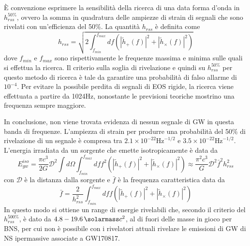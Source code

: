 È convenzione esprimere la sensibilità della ricerca di una data forma d'onda in $h_{rss}^{50\%}$, ovvero la somma in quadratura delle ampiezze di strain di segnali che sono rivelati con un'efficienza del 50\%. La quantità $h_{rss}$ è definita come
\begin{equation}
h_{rss} = \sqrt{2\int_{f_{min}}^{f_{max}}df(|\tilde{h}_+(f)|^2 + |\tilde{h}_\times(f)|^2 )}
\end{equation}
dove $f_{min}$ e $f_{max}$ sono rispettivamente le frequenze massima e minima sulle quali si effettua la ricerca. 
Il criterio sulla soglia di rivelazione e quindi su $h_{rss}^{50\%}$ per questo metodo di ricerca è tale da garantire una probabilità di falso allarme di $10^{-4}$.
Per evitare la possibile perdita di segnali di EOS rigide, la ricerca viene effettuata a partire da 1024Hz, nonostante le previsioni teoriche mostrino una frequenza sempre maggiore.

In conclusione, non viene trovata evidenza di nessun segnale di GW in questa banda di frequenze.
L'ampiezza di strain per produrre una probabilità del 50\% di rivelazione di un segnale è compresa tra $2.1 \times 10^{-22} \text{Hz}^{-1/2}$ e $3.5 \times 10^{-22} \text{Hz}^{-1/2}$. L'energia irradiata da un sorgente che emette isotropicamente è data da 
\begin{equation}
E_{gw}^{iso} = \frac{\pi c^3}{2G}\mathcal{D}^2\int d\Omega \int_{f_{min}}^{f_{max}}dff^2(|\tilde{h}_+(f)|^2 + |\tilde{h}_\times(f)|^2 ) \approx \frac{\pi^2 c^3}{G}\mathcal{D}^2\bar{f}^2h_{rss}^2
\end{equation}
con $\mathcal{D}$ è la distanza dalla sorgente e $\bar{f}$ è la frequenza caratteristica data da 
\begin{equation}
\bar{f} = \frac{2}{h_{rss}^2}\int_{f_{min}}^{f_{max}}dff(|\tilde{h}_+(f)|^2 + |\tilde{h}_\times(f)|^2 )
\end{equation}
In questo modo si ottiene un range di energie rivelabili che, secondo il criterio del $h_{rss}^{500\%}$, è dato da $4.8-\SI{19.6}{\solarmass}c^2$, al di fuori delle masse in gioco per BNS, per cui non è possibile con i rivelatori attuali rivelare le emissioni di GW di NS ipermassive associate a GW170817.

